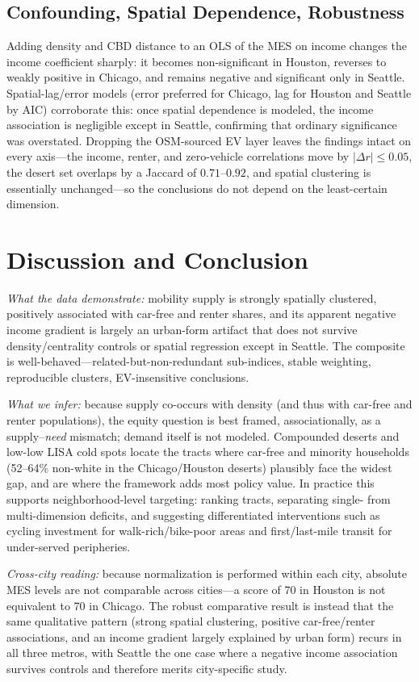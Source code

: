 \documentclass[conference]{IEEEtran}
\begin{document}
\subsection{Confounding, Spatial Dependence, Robustness}
Adding density and CBD distance to an OLS of the MES on income changes the
income coefficient sharply: it becomes non-significant in Houston, reverses to
weakly positive in Chicago, and remains negative and significant only in
Seattle. Spatial-lag/error models (error preferred for Chicago, lag for Houston
and Seattle by AIC) corroborate this: once spatial dependence is modeled, the
income association is negligible except in Seattle, confirming that ordinary
significance was overstated. Dropping the OSM-sourced EV layer leaves the
findings intact on every axis---the income, renter, and zero-vehicle
correlations move by $|\Delta r|\leq 0.05$, the desert set overlaps by a Jaccard
of $0.71$--$0.92$, and spatial clustering is essentially unchanged---so the
conclusions do not depend on the least-certain dimension.

\section{Discussion and Conclusion}
\emph{What the data demonstrate:} mobility supply is strongly spatially
clustered, positively associated with car-free and renter shares, and its
apparent negative income gradient is largely an urban-form artifact that does
not survive density/centrality controls or spatial regression except in Seattle.
The composite is well-behaved---related-but-non-redundant sub-indices, stable
weighting, reproducible clusters, EV-insensitive conclusions.

\emph{What we infer:} because supply co-occurs with density (and thus with
car-free and renter populations), the equity question is best framed,
associationally, as a supply--\emph{need} mismatch; demand itself is not
modeled. Compounded deserts and low-low LISA cold spots locate the tracts where
car-free and minority households (52--64\% non-white in the Chicago/Houston
deserts) plausibly face the widest gap, and are where the framework adds most
policy value. In practice this supports neighborhood-level targeting: ranking
tracts, separating single- from multi-dimension deficits, and suggesting
differentiated interventions such as cycling investment for walk-rich/bike-poor
areas and first/last-mile transit for under-served peripheries.

\emph{Cross-city reading:} because normalization is performed within each city,
absolute MES levels are not comparable across cities---a score of 70 in Houston
is not equivalent to 70 in Chicago. The robust comparative result is instead
that the same qualitative pattern (strong spatial clustering, positive
car-free/renter associations, and an income gradient largely explained by urban
form) recurs in all three metros, with Seattle the one case where a negative
income association survives controls and therefore merits city-specific study.
\end{document}

